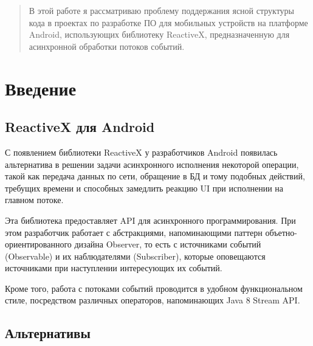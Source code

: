 \documentclass[12pt]{extarticle}
\begin{document}



\begin{abstract}

\noindent В этой работе я рассматриваю проблему поддержания ясной структуры кода в проектах по разработке ПО для мобильных устройств на платформе Android, использующих библиотеку ReactiveX, предназначенную для асинхронной обработки потоков событий.

\end{abstract}


\tableofcontents

\clearpage

\section{Введение}

\subsection{ReactiveX для Android}
С появлением библиотеки ReactiveX у разработчиков Android появилась альтернатива в решении задачи асинхронного исполнения некоторой операции, такой как передача данных по сети, обращение в БД и тому подобных действий, требущих времени и способных замедлить реакцию UI при исполнении на главном потоке. 

Эта библиотека предоставляет API для асинхронного программирования. При этом разработчик работает с абстракциями, напоминающими паттерн объетно-ориентированного дизайна Observer, то есть с источниками событий (Observable) и их наблюдателями (Subscriber), которые оповещаются источниками при наступлении интересующих их событий.

Кроме того, работа с потоками событий проводится в удобном функциональном стиле, посредством различных операторов, напоминающих Java 8 Stream API.

\subsection{Альтернативы}
\end{document}
